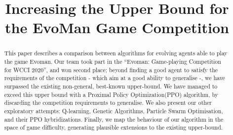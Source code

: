 \documentclass[conference]{IEEEtran}
\begin{document}
    \title{Increasing the Upper Bound for the EvoMan Game Competition}

    \author{
          \and
          
      
        \and
      }

    \maketitle

    \begin{abstract}
      This paper describes a comparison between algorithms for evolving agents able to play the game Evoman.
      Our team took part in the ``Evoman: Game-playing Competition for WCCI 2020'', and won second place;
      beyond finding a good agent to satisfy the requirements of the competition - which aim at a good ability to generalise -,
      we have surpassed the existing non-general, best-known upper-bound.
      We have managed to exceed this upper bound with a Proximal Policy Optimization(PPO) algorithm, by discarding the competition requirements to generalise.
      We also present our other exploratory attempts: Q-learning, Genetic Algorithms, Particle Swarm Optimisation, and their PPO hybridizations. 
      Finally, we map the behaviour of our algorithm in the space of game difficulty, generating plausible extensions to the existing upper-bound.
    \end{abstract}
\end{document}
